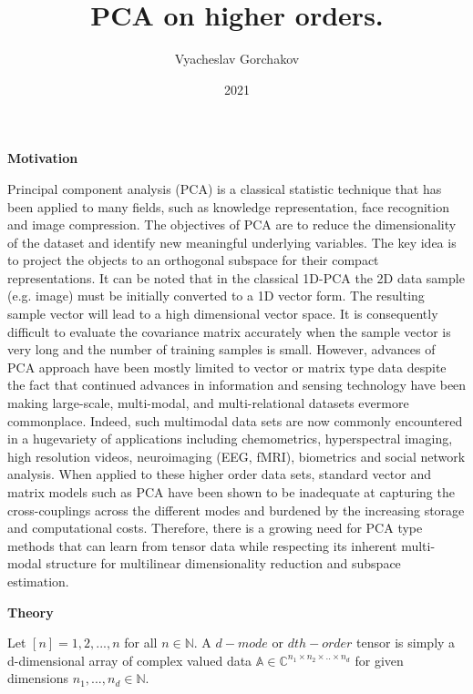 \documentclass[a4paper,12pt]{article}
\author{Vyacheslav Gorchakov}
\title{PCA on higher orders.}
\date{2021}
\begin{document}
\maketitle
\newpage

\smallskip

\begin{center}
{\bf Motivation }
\end{center}

Principal component analysis (PCA) is a classical
statistic technique that has been applied to many fields, such
as knowledge representation, face recognition and image
compression. The objectives of PCA are to reduce the dimensionality of the dataset and identify new meaningful underlying variables. The key idea is to project the objects to an orthogonal subspace for their compact representations. It can be noted that in the classical 1D-PCA
the 2D data sample (e.g. image) must be initially converted
to a 1D vector form. The resulting sample vector will lead
to a high dimensional vector space. It is consequently difficult to evaluate the covariance matrix accurately when the sample vector is very long and the number of training samples is small. However, advances of PCA approach have been mostly limited to vector or matrix type data despite the fact that continued advances in information and sensing technology have been making large-scale, multi-modal, and multi-relational datasets evermore commonplace. Indeed, such multimodal data sets are now commonly encountered in a hugevariety of applications including chemometrics, hyperspectral imaging, high resolution videos, neuroimaging (EEG, fMRI), biometrics and social network analysis. When applied to these higher order data sets, standard vector and matrix models such as PCA have been shown to be inadequate at capturing the cross-couplings across the different modes and burdened
by the increasing storage and computational costs. Therefore, there is a growing need for PCA type methods that can learn from tensor data while respecting its inherent multi-modal structure for multilinear dimensionality reduction and subspace estimation.

\begin{center}
{\bf Theory }
\end{center}
Let $[n] = {1,2,...,n}$ for all $n \in \mathbb{N}$. A $d-mode$ or $dth-order$ tensor is simply a d-dimensional array of complex valued data $\mathbb{A} \in \mathbb{C}^{n_1 \times n_2 \times .. \times n_d}$ for given dimensions $n_1, ..., n_d \in \mathbb{N}$.
\end{document}
